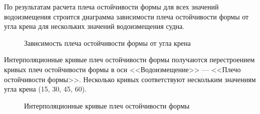 \begin{table}[H]
    \centering
    \footnotesize
    \caption{Пример расчета плеча остойчивости формы}
    \caption*{\textit{
        Схема расчета приведена на рисунке \ref{tab:kryloff-method-II}.
    }}
\end{table}

По результатам расчета плеча остойчивости формы для всех значений водоизмещения строится диаграмма зависимости плеча остойчивости формы от угла крена для нескольких значений водоизмещения судна.

\begin{figure}[H]
    \centerline{}
    \caption{Зависимость плеча остойчивости формы от угла крена}
\end{figure}

Интерполяционные кривые плеч остойчивости формы получаются перестроением кривых плеч остойчивости формы в оси <<Водоизмещение>> --- <<Плечо остойчивости формы>>.
Несколько кривых соответствуют нескольким значениям угла крена (15\textdegree, 30\textdegree, 45\textdegree, 60\textdegree).

\begin{figure}[H]
    \centerline{}
    \caption{Интерполяционные кривые плеч остойчивости формы}
\end{figure}

